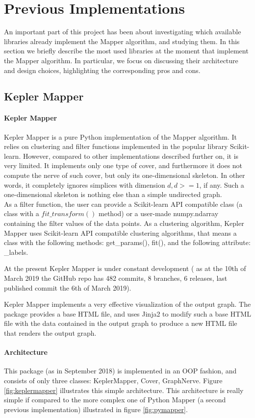 \section{Previous Implementations}
An important part of this project has been about investigating which available libraries already implement the Mapper algorithm, and studying them.
In this section we briefly describe the most used libraries at the moment that implement the Mapper algorithm. In particular, we focus on discussing their architecture and design choices, highlighting the corresponding pros and cons.

\subsection{Kepler Mapper}
\paragraph{Kepler Mapper}
Kepler Mapper is a pure Python implementation of the Mapper algorithm. It relies on clustering and filter functions implemented in the popular library Scikit-learn. However, compared to other implementations described further on, it is very limited. It implements only one type of cover, and furthermore it does not compute the nerve of such cover, but only its one-dimensional skeleton. In other words, it completely ignores simplices with dimension $d, d>=1$, if any. Such a one-dimensional skeleton is nothing else than a simple undirected graph.\\
As a filter function, the user can provide a Scikit-learn API compatible class (a class with a $fit\_transform()$ method) or a user-made numpy.ndarray containing the filter values of the data points. As a clustering algorithm, Kepler Mapper uses Scikit-learn API compatible clustering algorithms, that means a class with the following methods: get\_params(), fit(), and the following attribute: \_labels.

At the present Kepler Mapper is under constant development ( as at the 10th of March 2019 the GitHub repo has 482 commits, 8 branches, 6 releases, last published commit the 6th of March 2019).

Kepler Mapper implements a very effective visualization of the output graph. The package provides a base HTML file, and uses Jinja2 to modify such a base HTML file with the data contained in the output graph to produce a new HTML file that renders the output graph.
\paragraph{Architecture}
This package (as in September 2018) is implemented in an OOP fashion, and consists of only three classes: KeplerMapper, Cover, GraphNerve. Figure \ref{fig:keplermapper} illustrates this simple architecture. This architecture is really simple if compared to the more complex one of Python Mapper (a second previous implementation) illustrated in figure \ref{fig:pymapper}.
